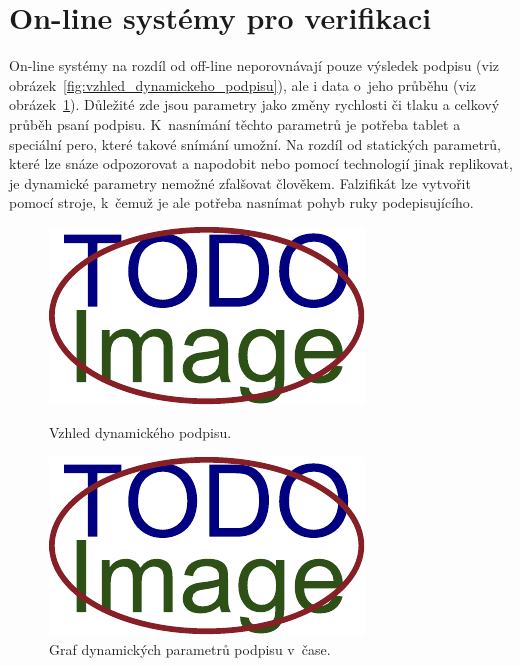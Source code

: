 \section{On-line systémy pro verifikaci} 
On-line systémy na rozdíl od off-line neporovnávají pouze výsledek podpisu (viz obrázek~\ref{fig:vzhled_dynamickeho_podpisu}), ale i data o~jeho průběhu (viz obrázek~\ref{fig:graf_dynamickych_parametru}). %
Důležité zde jsou parametry jako změny rychlosti či tlaku a celkový průběh psaní podpisu.              %
K~nasnímání těchto parametrů je potřeba tablet a speciální pero, které takové snímání umožní.          %
Na rozdíl od statických parametrů, které lze snáze odpozorovat a napodobit                             %
nebo pomocí technologií jinak replikovat, je dynamické parametry nemožné zfalšovat člověkem.           %
Falzifikát lze vytvořit pomocí stroje, k~čemuž je ale potřeba nasnímat pohyb ruky podepisujícího.~\cite{VaccaJohnR2007}%

\begin{figure}[h]
  \centering
  \begin{minipage}{0.45\textwidth}
      \centering
      \includegraphics[width=\textwidth]{obrazky-figures/placeholder.pdf}
      \caption{Vzhled dynamického podpisu.}
      \label{fig:vzhled_dynamickeho_podpisu}
  \end{minipage}\hfill
  \begin{minipage}{0.45\textwidth}
      \centering
      \includegraphics[width=\textwidth]{obrazky-figures/placeholder.pdf}
      \caption{Graf dynamických parametrů podpisu v~čase.}
      \label{fig:graf_dynamickych_parametru}
  \end{minipage}
\end{figure}

